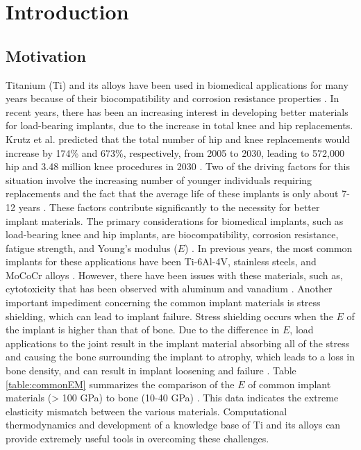\chapter{Introduction} \label{chapter1:introduction}

\section{\sloppy Motivation}
Titanium (Ti) and its alloys have been used in biomedical applications for many years because of their biocompatibility and corrosion resistance properties \cite{Long1998a}. In recent years, there has been an increasing interest in developing better materials for load-bearing implants, due to the increase in total knee and hip replacements. Krutz et al. predicted that the total number of hip and knee replacements would increase by 174\% and 673\%, respectively, from 2005 to 2030, leading to 572,000 hip and 3.48 million knee procedures in 2030 \cite{Kurtz2007}. Two of the driving factors for this situation involve the increasing number of younger individuals requiring replacements and the fact that the average life of these implants is only about 7-12 years \cite{Krishna2007a}. These factors contribute significantly to the necessity for better implant materials. The primary considerations for biomedical implants, such as load-bearing knee and hip implants, are biocompatibility, corrosion resistance, fatigue strength, and Young's modulus ($E$) \cite{Long1998a}. In previous years, the most common implants for these applications have been Ti-6Al-4V, stainless steels, and MoCoCr alloys \cite{Niinomi2003,Niinomi2012}. However, there have been issues with these materials, such as, cytotoxicity that has been observed with aluminum and vanadium \cite{Ito1995a}. Another important impediment concerning the common implant materials is stress shielding, which can lead to implant failure. Stress shielding occurs when the $E$ of the implant is higher than that of bone. Due to the difference in $E$, load applications to the joint result in the implant material absorbing all of the stress and causing the bone surrounding the implant to atrophy, which leads to a loss in bone density, and can result in implant loosening and failure \cite{Long1998a}.  Table \ref{table:commonEM} summarizes the comparison of the $E$ of common implant materials (> 100 GPa) to bone (10-40 GPa) \cite{Long1998a}. This data indicates the extreme elasticity mismatch between the various materials. Computational thermodynamics and development of a knowledge base of Ti and its alloys can provide extremely useful tools in overcoming these challenges.

